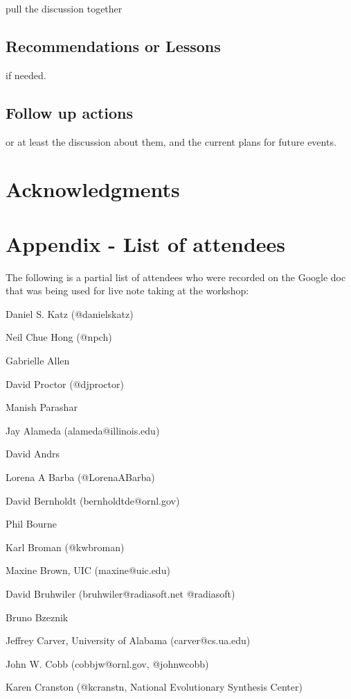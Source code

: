\documentclass[11pt, oneside]{amsart}
\begin{document}
pull the discussion together

\subsection{Recommendations or Lessons}

if needed.

\subsection{Follow up actions}

or at least the discussion about them, and the current plans for future events.

\section*{Acknowledgments}

\section*{Appendix - List of attendees}

The following is a partial list of attendees who were recorded on the Google doc that was being used for live note taking at the workshop:

Daniel S. Katz (@danielskatz)

Neil Chue Hong (@npch)

Gabrielle Allen

David Proctor (@djproctor)

Manish Parashar

Jay Alameda (alameda@illinois.edu)

David Andrs

Lorena A Barba (@LorenaABarba)

David Bernholdt (bernholdtde@ornl.gov)

Phil Bourne

Karl Broman (@kwbroman)

Maxine Brown, UIC (maxine@uic.edu)

David Bruhwiler   (bruhwiler@radiasoft.net    @radiasoft)

Bruno Bzeznik

Jeffrey Carver, University of Alabama (carver@cs.ua.edu)

John W. Cobb (cobbjw@ornl.gov, @johnwcobb)

Karen Cranston (@kcranstn, National Evolutionary Synthesis Center)
\end{document}
